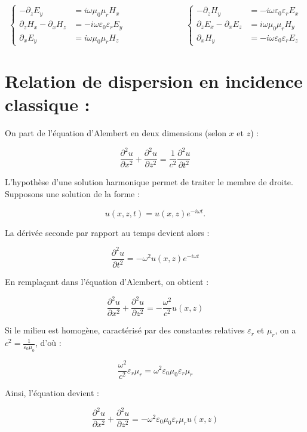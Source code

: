 \documentclass{article}
\begin{document}
\[
\left\{
\begin{aligned}
-\partial_z E_y &= i\omega \mu_0 \mu_r H_x \\
\partial_z H_x - \partial_x H_z &= -i\omega \varepsilon_0 \varepsilon_r E_y \\
\partial_x E_y &= i\omega \mu_0 \mu_r H_z
\end{aligned}
\right.
\hspace{3cm}
\left\{
\begin{aligned}
-\partial_z H_y &= -i\omega \varepsilon_0 \varepsilon_r E_x \\
\partial_z E_x - \partial_x E_z &= i\omega \mu_0 \mu_r H_y \\
\partial_x H_y &= -i\omega \varepsilon_0 \varepsilon_r E_z
\end{aligned}
\right.
\]

\section*{Relation de dispersion en incidence classique :}

On part de l'équation d’Alembert en deux dimensions (selon \(x\) et \(z\)) :

\[
\frac{\partial^2 u}{\partial x^2} + \frac{\partial^2 u}{\partial z^2} = \frac{1}{c^2} \frac{\partial^2 u}{\partial t^2}
\]

L'hypothèse d'une solution harmonique permet de traiter le membre de droite. Supposons une solution de la forme :

\[
u(x, z, t) = u(x, z)  e^{-i \omega t}.
\]

La dérivée seconde par rapport au temps devient alors :

\[
\frac{\partial^2 u}{\partial t^2} = -\omega^2 u(x, z)  e^{-i \omega t}
\]

En remplaçant dans l’équation d’Alembert, on obtient :

\[
\frac{\partial^2 u}{\partial x^2} + \frac{\partial^2 u}{\partial z^2} = -\frac{\omega^2}{c^2} u(x, z)
\]

Si le milieu est homogène, caractérisé par des constantes relatives \( \varepsilon_r \) et \( \mu_r \), on a \( c^2 = \frac{1}{\varepsilon_0 \mu_0} \), d’où :

\[
\frac{\omega^2}{c^2} \varepsilon_r \mu_r = \omega^2 \varepsilon_0 \mu_0 \varepsilon_r \mu_r
\]

Ainsi, l'équation devient :

\[
\frac{\partial^2 u}{\partial x^2} + \frac{\partial^2 u}{\partial z^2} = -\omega^2 \varepsilon_0 \mu_0 \varepsilon_r \mu_r  u(x, z)
\]
\end{document}
